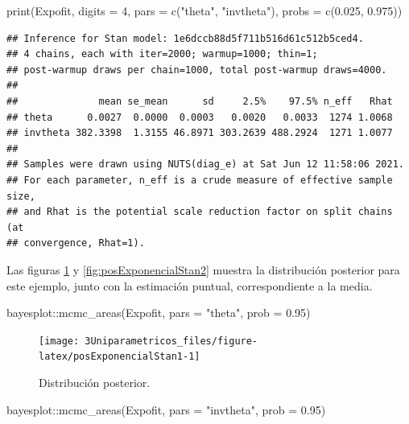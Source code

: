 \documentclass[
  10pt,
  spanish,
]{book}
\newenvironment{Shaded}{\begin{snugshade}}{\end{snugshade}}
\newcommand{\AttributeTok}[1]{\textcolor[rgb]{0.77,0.63,0.00}{#1}}
\newcommand{\DecValTok}[1]{\textcolor[rgb]{0.00,0.00,0.81}{#1}}
\newcommand{\FloatTok}[1]{\textcolor[rgb]{0.00,0.00,0.81}{#1}}
\newcommand{\FunctionTok}[1]{\textcolor[rgb]{0.00,0.00,0.00}{#1}}
\newcommand{\NormalTok}[1]{#1}
\newcommand{\SpecialCharTok}[1]{\textcolor[rgb]{0.00,0.00,0.00}{#1}}
\newcommand{\StringTok}[1]{\textcolor[rgb]{0.31,0.60,0.02}{#1}}
\theoremstyle{definition}
\theoremstyle{definition}
\theoremstyle{definition}
\theoremstyle{definition}
\theoremstyle{remark}
\begin{document}
\begin{Shaded}
\begin{Highlighting}[]
\FunctionTok{print}\NormalTok{(Expofit, }\AttributeTok{digits =} \DecValTok{4}\NormalTok{, }
      \AttributeTok{pars =} \FunctionTok{c}\NormalTok{(}\StringTok{"theta"}\NormalTok{, }\StringTok{"invtheta"}\NormalTok{),}
      \AttributeTok{probs =} \FunctionTok{c}\NormalTok{(}\FloatTok{0.025}\NormalTok{, }\FloatTok{0.975}\NormalTok{))}
\end{Highlighting}
\end{Shaded}

\begin{verbatim}
## Inference for Stan model: 1e6dccb88d5f711b516d61c512b5ced4.
## 4 chains, each with iter=2000; warmup=1000; thin=1; 
## post-warmup draws per chain=1000, total post-warmup draws=4000.
## 
##              mean se_mean      sd     2.5%    97.5% n_eff   Rhat
## theta      0.0027  0.0000  0.0003   0.0020   0.0033  1274 1.0068
## invtheta 382.3398  1.3155 46.8971 303.2639 488.2924  1271 1.0077
## 
## Samples were drawn using NUTS(diag_e) at Sat Jun 12 11:58:06 2021.
## For each parameter, n_eff is a crude measure of effective sample size,
## and Rhat is the potential scale reduction factor on split chains (at 
## convergence, Rhat=1).
\end{verbatim}

Las figuras \ref{fig:posExponencialStan1} y \ref{fig:posExponencialStan2} muestra la distribución posterior para este ejemplo, junto con la estimación puntual, correspondiente a la media.

\begin{Shaded}
\begin{Highlighting}[]
\NormalTok{bayesplot}\SpecialCharTok{::}\FunctionTok{mcmc\_areas}\NormalTok{(Expofit, }\AttributeTok{pars =} \StringTok{"theta"}\NormalTok{, }
                      \AttributeTok{prob =} \FloatTok{0.95}\NormalTok{)}
\end{Highlighting}
\end{Shaded}

\begin{figure}

{\centering \texttt{[image: 3Uniparametricos\_files/figure-latex/posExponencialStan1-1]} 

}

\caption{Distribución posterior.}\label{fig:posExponencialStan1}
\end{figure}

\begin{Shaded}
\begin{Highlighting}[]
\NormalTok{bayesplot}\SpecialCharTok{::}\FunctionTok{mcmc\_areas}\NormalTok{(Expofit, }\AttributeTok{pars =} \StringTok{"invtheta"}\NormalTok{, }
                      \AttributeTok{prob =} \FloatTok{0.95}\NormalTok{)}
\end{Highlighting}
\end{Shaded}
\end{document}
